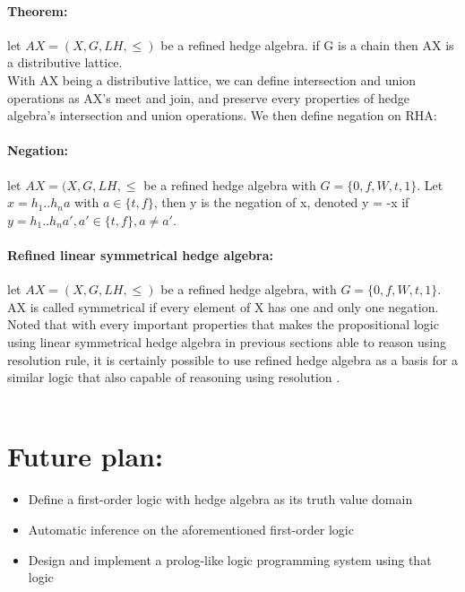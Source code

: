 \documentclass[26pt,fleqn,]{article}
\begin{document}
\paragraph{Theorem: } let \(AX = (X,G,LH,\le)\) be a refined hedge algebra. if G is a chain then AX is
a distributive lattice.\\
With AX being a distributive lattice, we can define intersection and union operations as AX's meet and 
join, and preserve every properties of hedge algebra's intersection and union operations. We then define
negation on RHA:\\
\paragraph{Negation: } let \(AX = (X,G,LH,\le\) be a refined hedge algebra with \(G = \{
0,f,W,t,1\}\). Let \(x = h_1..h_n a\) with \(a \in \{t,f\}\), then y is the negation of x, denoted 
y = -x if \(y = h_1..h_n a', a' \in \{t,f\}, a \neq a'\).\\
\paragraph{Refined linear symmetrical hedge algebra: } let \(AX = (X,G,LH,\le)\) be a refined hedge
algebra, with \(G = \{0,f,W,t,1\}\). AX is called symmetrical if every element of X has one and only one
 negation.\\
Noted that with every important properties that makes the propositional logic using linear symmetrical
hedge algebra in previous sections able to reason using resolution rule, it is certainly possible to 
use refined hedge algebra as a basis for a similar logic that also capable of reasoning using resolution
.\\\\

\section{Future plan:}
\begin{itemize}
	\item  Define a first-order logic with hedge algebra as its truth value domain
	\item  Automatic inference on the aforementioned first-order logic	
	\item  Design and implement a prolog-like logic programming system using 
		that logic
\end{itemize}
\end{document}
